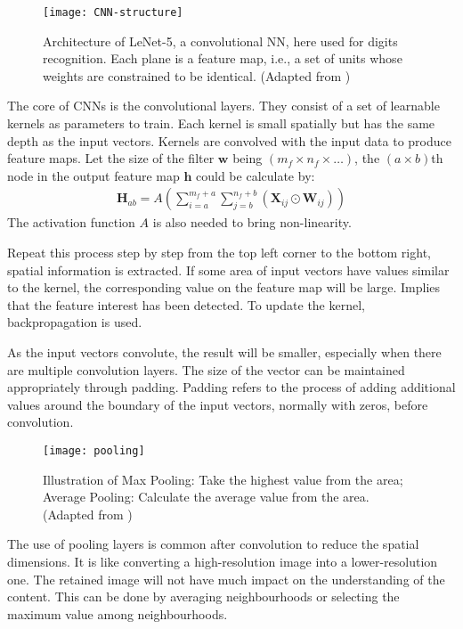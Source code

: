 \begin{figure}[!htb]
    \centering
    \texttt{[image: CNN-structure]}
    \caption{Architecture of LeNet-5, a convolutional NN, here used for digits recognition. Each plane is a feature map, i.e., a set of units whose weights are constrained to be identical. (Adapted from \cite{726791})}
    \label{Figure:CNN-structure}
\end{figure}

The core of CNNs is the convolutional layers. They consist of a set of learnable kernels as parameters to train. Each kernel is small spatially but has the same depth as the input vectors. 
Kernels are convolved with the input data to produce feature maps. Let the size of the filter $\mathbf{w}$ being $(m_f \times n_f \times \dots)$, the $(a \times b)$th node in the output feature map $\mathbf{h}$ could be calculate by:
\begin{gather}
    \mathbf{H}_{ab} = A(\sum_{i=a}^{m_f+a} \sum_{j=b}^{n_f+b} (\mathbf{X}_{ij} \odot \mathbf{W}_{ij}))
\end{gather}
The activation function $A$ is also needed to bring non-linearity. 

Repeat this process step by step from the top left corner to the bottom right, spatial information is extracted. 
If some area of input vectors have values similar to the kernel, the corresponding value on the feature map will be large.
Implies that the feature interest has been detected. To update the kernel, backpropagation is used. 

As the input vectors convolute, the result will be smaller, especially when there are multiple convolution layers. The size of the vector can be maintained appropriately through padding. 
Padding refers to the process of adding additional values around the boundary of the input vectors, normally with zeros, before convolution. 

\begin{figure}[!htb]
    \centering
    \texttt{[image: pooling]}
    \caption{Illustration of Max Pooling: Take the highest value from the area; Average Pooling: Calculate the average value from the area. (Adapted from \cite{poolingplot})}
    \label{Figure:pooling}
\end{figure}

The use of pooling layers is common after convolution to reduce the spatial dimensions. It is like converting a high-resolution image into a lower-resolution one. 
The retained image will not have much impact on the understanding of the content. This can be done by averaging neighbourhoods or selecting the maximum value among neighbourhoods. 

